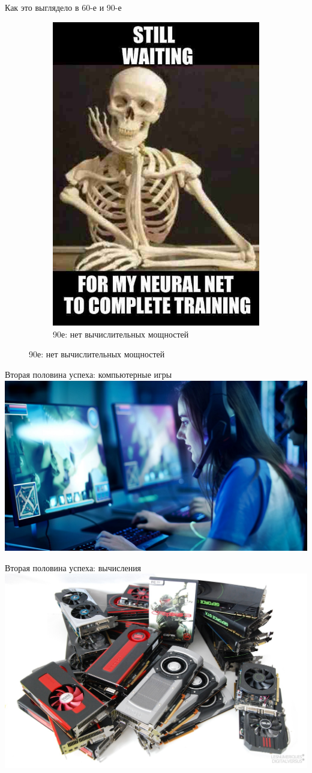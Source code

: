\documentclass[aspectratio=169]{beamer}
\begin{document}
\begin{frame}{Как это выглядело в 60-е и 90-е}
\begin{figure}
\begin{subfigure}{.49\linewidth}
            \includegraphics[width=.57\linewidth]{graphs/fig21_1.jpg}
            \caption*{90е: нет вычислительных мощностей}
        \end{subfigure}
    \end{figure}
\end{frame}

\begin{frame}{Вторая половина успеха: компьютерные игры}
    \centering
    \includegraphics[width=.83\linewidth]{graphs/fig22.jpg}
\end{frame}

\begin{frame}{Вторая половина успеха: вычисления}
    \centering
    \includegraphics[width=.74\linewidth]{graphs/fig23.jpg}
\end{frame}
\end{document}
